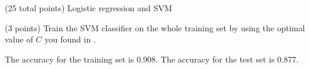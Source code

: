 \documentclass[12pt]{article}
\begin{document}
\begin{question}{(25 total points) Logistic regression and SVM}
\begin{subquestion}
   

  


   \end{subquestion}
   \begin{subquestion}{(3 points)
       Train the SVM classifier on the whole training set by using the
       optimal value of $C$ you found in . 
     } \label{Q2.6}


       

      \begin{answerbox}{10em}
         The accuracy for the training set is 0.908. The accuracy for the test set is 0.877.
      \end{answerbox}
  


   \end{subquestion}
%
%

\end{question}
\clearpage
%
%
\end{document}

